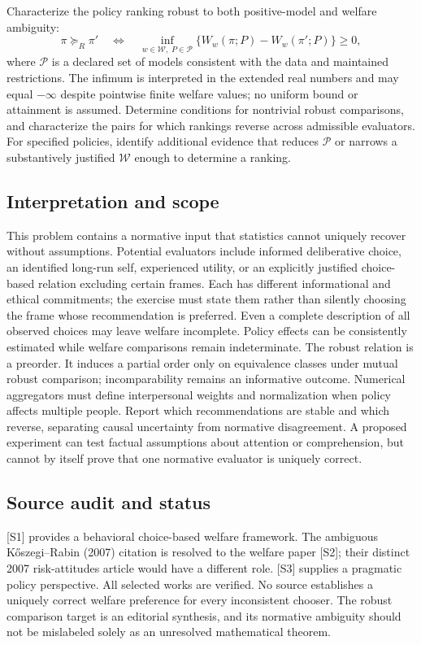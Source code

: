 \documentclass[11pt,a4paper]{article}
\begin{document}
Characterize the policy ranking robust to both positive-model and welfare ambiguity:
\[
\pi\succeq_R\pi'\quad\Longleftrightarrow\quad
\inf_{w\in\mathcal W,\;P\in\mathcal P}\{W_w(\pi;P)-W_w(\pi';P)\}\geq0,
\]
where $\mathcal P$ is a declared set of models consistent with the data and maintained restrictions. The infimum is interpreted in the extended real numbers and may equal $-\infty$ despite pointwise finite welfare values; no uniform bound or attainment is assumed. Determine conditions for nontrivial robust comparisons, and characterize the pairs for which rankings reverse across admissible evaluators. For specified policies, identify additional evidence that reduces $\mathcal P$ or narrows a substantively justified $\mathcal W$ enough to determine a ranking.

\subsection*{Interpretation and scope}

This problem contains a normative input that statistics cannot uniquely recover without assumptions. Potential evaluators include informed deliberative choice, an identified long-run self, experienced utility, or an explicitly justified choice-based relation excluding certain frames. Each has different informational and ethical commitments; the exercise must state them rather than silently choosing the frame whose recommendation is preferred. Even a complete description of all observed choices may leave welfare incomplete. Policy effects can be consistently estimated while welfare comparisons remain indeterminate. The robust relation is a preorder. It induces a partial order only on equivalence classes under mutual robust comparison; incomparability remains an informative outcome. Numerical aggregators must define interpersonal weights and normalization when policy affects multiple people. Report which recommendations are stable and which reverse, separating causal uncertainty from normative disagreement. A proposed experiment can test factual assumptions about attention or comprehension, but cannot by itself prove that one normative evaluator is uniquely correct.

\subsection*{Source audit and status}

[S1] provides a behavioral choice-based welfare framework. The ambiguous Kőszegi--Rabin (2007) citation is resolved to the welfare paper [S2]; their distinct 2007 risk-attitudes article would have a different role. [S3] supplies a pragmatic policy perspective. All selected works are verified. No source establishes a uniquely correct welfare preference for every inconsistent chooser. The robust comparison target is an editorial synthesis, and its normative ambiguity should not be mislabeled solely as an unresolved mathematical theorem.
\end{document}
